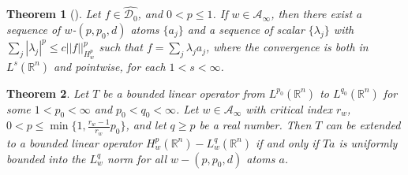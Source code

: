 \documentclass[10pt,a4paper]{amsart}
\newtheorem{theorem}{Theorem}
\begin{document}
	\begin{theorem}[\cite{Rocha}]\label{Theorem9}
		Let $f \in \hat{\mathcal{D}_0}$, and $0<p \leq 1$. If $w \in \mathcal{A}_{\infty}$, then there exist a sequence of $w$-$(p,p_0,d)$ atoms $\{a_j\}$ and a sequence of scalar $\{\lambda_j\}$ with $\sum_j |\lambda_j|^{p} \leq c||f||^{p}_{H^{p}_w}$ such that $f=\sum_j \lambda_ja_j$, where the convergence is both in $L^{s}(\mathbb{R}^{n})$ and pointwise, for each $1<s<\infty$.
	\end{theorem}

	\begin{theorem}\label{Extension}
		Let $T$ be a bounded linear operator from $L^{p_0}(\mathbb{R}^{n})$ to $L^{q_0}(\mathbb{R}^{n})$ for some $1<p_0<\infty$ and $p_0<q_0<\infty$. Let $w \in \mathcal{A}_{\infty}$ with critical index $r_w$, $0<p \leq \min \{1, \frac{r_w-1}{r_w} p_0 \}$, and let $q\geq p$ be a real number. Then $T$ can be extended to a bounded linear operator $H^{p}_w(\mathbb{R}^{n})-L^{q}_w(\mathbb{R}^{n})$ if and only if $Ta$ is uniformly bounded into the $L^{q}_w$ norm for all $w-(p,p_0,d)$ atoms $a$.
	\end{theorem}
\end{document}

